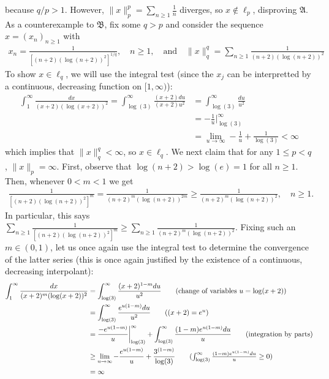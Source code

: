 \documentclass[10pt]{article}
\newcommand{\1}[1]{\mathbbm{1}_{#1}}
\begin{document}
    because $q/p>1$. However, $\|x\|^p_p=\sum_{n\geq 1}\tfrac{1}{n}$ diverges,
    so $x\notin\ell_p$, disproving $\mathfrak{A}$.\\[5pt]
    As a counterexample to $\mathfrak{B}$, fix some $q>p$ and consider the
    sequence $x=(x_n)_{n\geq 1}$ with
    \begin{align*}
        x_n=\frac{1}{[(n+2)(\log(n+2))^2]^{1/q}},\quad n\geq 1,\quad\text{and}\quad\|x\|_q^q=\sum_{n\geq 1}\frac{1}{(n+2)(\log(n+2))^2}
    \end{align*}
    To show $x\in\ell_q$, we will use the integral test (since the $x_j$ can be
    interpretted by a continuous, decreasing function on $[1,\infty)$):
    \begin{align*}
        \int_1^\infty\frac{dx}{(x+2)(\log(x+2))^2}=\int_{\log(3)}^\infty\frac{(x+2)du}{(x+2)u^2}&=\int_{\log(3)}^\infty\frac{du}{u^2}\tag{change of variables $u=\log(x+2)$}\\
        &=-\frac{1}{u}\bigg|^\infty_{\log(3)}\\
        &=\lim_{u\rightarrow\infty}-\frac{1}{u}+\frac{1}{\log(3)}<\infty
    \end{align*}
    which implies that $\|x\|_q^q<\infty$, so $x\in\ell_q$. We next claim that
    for any $1\leq p<q$, $\|x\|_p=\infty$. First, observe that
    $\log(n+2)>\log(e)=1$ for all $n\geq 1$. Then, whenever $0<m<1$ we get
    \begin{align*}
        \frac{1}{[(n+2)(\log(n+2))^2]^m}=\frac{1}{(n+2)^m(\log(n+2))^{2m}}\geq\frac{1}{(n+2)^m(\log(n+2))^2},\quad n\geq 1.
    \end{align*}
    In particular, this says $\sum_{n\geq
    1}\tfrac{1}{[(n+2)(\log(n+2))^2]^m}\geq\sum_{n\geq
    1}\frac{1}{(n+2)^m(\log(n+2))^2}$. Fixing such an $m\in(0,1)$, let us once
    again use the integral test to determine the convergence of the latter
    series (this is once again justified by the existence of a continuous,
    decreasing interpolant):
    \begin{align*}
        \int_1^\infty\frac{dx}{(x+2)^m(\log(x+2))^2}&=\int_{\log(3)}^\infty\frac{(x+2)^{1-m}du}{u^2}\tag{change of variables $u=\log(x+2)$}\\
        &=\int_{\log(3)}^\infty\frac{e^{u(1-m)}du}{u^2}\tag{$(x+2)=e^u$}\\
        &=\frac{-e^{u(1-m)}}{u}\bigg|_{\log(3)}^\infty+\int_{\log(3)}^\infty\frac{(1-m)e^{u(1-m)}du}{u}\tag{integration by parts}\\
        &\geq \lim_{u\rightarrow\infty}-\frac{e^{u(1-m)}}{u}+\frac{3^{(1-m)}}{\log(3)}\tag{$\int_{\log(3)}^\infty\tfrac{(1-m)e^{u(1-m)}du}{u}\geq 0$}\\
        &=\infty
    \end{align*} 
\end{document}
